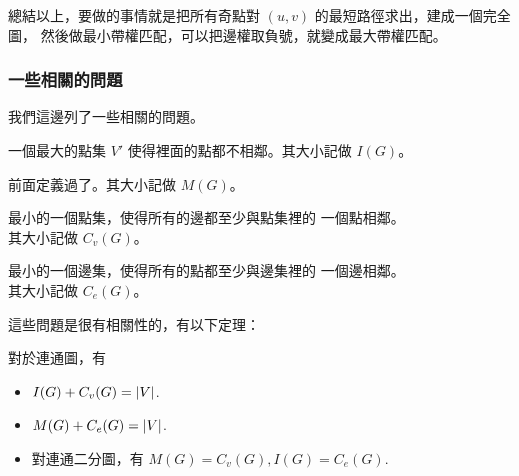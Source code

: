 \documentclass[a4paper,12pt]{book}
\begin{document}
總結以上，要做的事情就是把所有奇點對 $(u, v)$ 的最短路徑求出，建成一個完全圖，
然後做最小帶權匹配，可以把邊權取負號，就變成最大帶權匹配。

\subsubsection{一些相關的問題}
我們這邊列了一些相關的問題。
\begin{description}[leftmargin=*]
  \item[最大獨立點集] 一個最大的點集 $V'$ 使得裡面的點都不相鄰。其大小記做 $I(G)$。
  \item[最大匹配數] 前面定義過了。其大小記做 $M(G)$。
  \item[最小點覆蓋] 最小的一個點集，使得所有的邊都至少與點集裡的
    一個點相鄰。\\其大小記做 $C_v(G)$。
  \item[最小邊覆蓋] 最小的一個邊集，使得所有的點都至少與邊集裡的
    一個邊相鄰。\\其大小記做 $C_e(G)$。
\end{description}

\begin{figure}[H]
  \centering
  
\end{figure}
這些問題是很有相關性的，有以下定理：
\begin{theorem}
  對於連通圖，有
  \begin{itemize}
      \item $I(G) + C_v(G) = \lvert V \rvert$. 
        \listeqn \label{eq:m1}
      \item $M(G) + C_e(G) = \lvert V \rvert$.
        \listeqn \label{eq:m2}
      \item 對連通二分圖，有 $M(G) = C_v(G), I(G) = C_e(G)$.
        \listeqn \label{eq:m3}
  \end{itemize}
\end{theorem}
\end{document}
